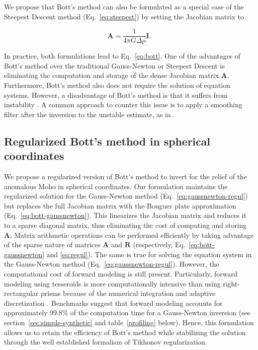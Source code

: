 \documentclass[extra]{gji}
\begin{document}
We propose that Bott's method can also be formulated as a special case of the
Steepest Descent method (Eq.~\ref{eq:steepest}) by setting the Jacobian matrix to

\begin{equation}
    \mathbf{A} = \dfrac{1}{4 \pi G \Delta \rho}\mathbf{I}.
    \label{eq:bott-steepest}
\end{equation}

\noindent
In practice, both formulations lead to Eq.~\ref{eq:bott}.
One of the advantages of Bott's method over the traditional Gauss-Newton or
Steepest Descent is eliminating the computation and storage of the dense
Jacobian matrix $\mathbf{A}$.
Furthermore, Bott's method also does not require the solution of equation
systems.
However, a disadvantage of Bott's method is that it suffers from instability
\citep{silva2014}.
A common approach to counter this issue is to apply a smoothing filter after
the inversion to the unstable estimate, as in \citet{silva2014}.



\subsection{Regularized Bott's method in spherical coordinates}

We propose a regularized version of Bott's method to invert for the relief of
the anomalous Moho in spherical coordinates.
Our formulation maintains the regularized solution
for the Gauss-Newton method (Eq.~\ref{eq:gaussnewton-regul})
but replaces the full Jacobian matrix with the Bouguer plate approximation
(Eq.~\ref{eq:bott-gaussnewton}).
This linearizes the Jacobian matrix and reduces it to a sparse diagonal matrix,
thus eliminating the cost of computing and storing $\mathbf{A}$.
Matrix arithmetic operations can be performed efficiently by taking advantage
of the sparse nature of matrices $\mathbf{A}$ and $\mathbf{R}$
(respectively, Eq.~\ref{eq:bott-gaussnewton} and \ref{eq:regul}).
The same is true for solving the equation system in the Gauss-Newton method
(Eq.~\ref{eq:gaussnewton-regul}).
However, the computational cost of forward modeling is still present.
Particularly, forward modeling using tesseroids is more computationally
intensive than using right-rectangular prisms
because of the numerical integration and adaptive discretization
\citep{uieda2016}.
Benchmarks suggest that
forward modeling accounts for approximately $99.8\%$
of the computation time for a Gauss-Newton inversion
(see section~\ref{sec:simple-synthetic} and table~\ref{profiling} below).
Hence, this formulation allows us to retain the efficiency of Bott's method
while stabilizing the solution through the well established formalism of
Tikhonov regularization.
\end{document}
